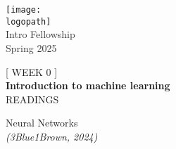 \documentclass[12pt]{article}
\def\logopath{../assets/caiac_logo.png}  %
\def\programlongname{program_long_name}
\def\programlongname{
    Intro Fellowship
}
\def\timeperiod{
    Spring 2025
}
\def\chroninfo{
    WEEK 0
}
\def\maintitle{
    Introduction to machine learning
}
\def\mainsubtitle{
    READINGS
}  %
\begin{document}
\thispagestyle{empty} %

\begin{center}
    \texttt{[image: \\logopath]}\\
    \vspace{0.5em}
    {\Large \textcolor[HTML]{333333}{\programlongname}}\\
    \vspace{0.5em}
    {\textcolor[HTML]{333333}{\timeperiod}}
\end{center}

\vspace{8em}

\begin{center}
    [ \chroninfo ]\\
    \vspace{0.7em}
    {\Huge \textbf{\maintitle}}\\
    \vspace{0.7em}
    \uppercase{\mainsubtitle}
\end{center}

\vfill  %

\begin{center}
\begin{minipage}{0.8\textwidth}  %
\centering
% 
{\color{primaryFaded}
    {\footnotesize
        Neural Networks\\
        \emph{(3Blue1Brown, 2024)}
    }
}
\vspace{1em}
% 
\end{minipage}
\end{center}

\vspace{2em}  %
\end{document}
